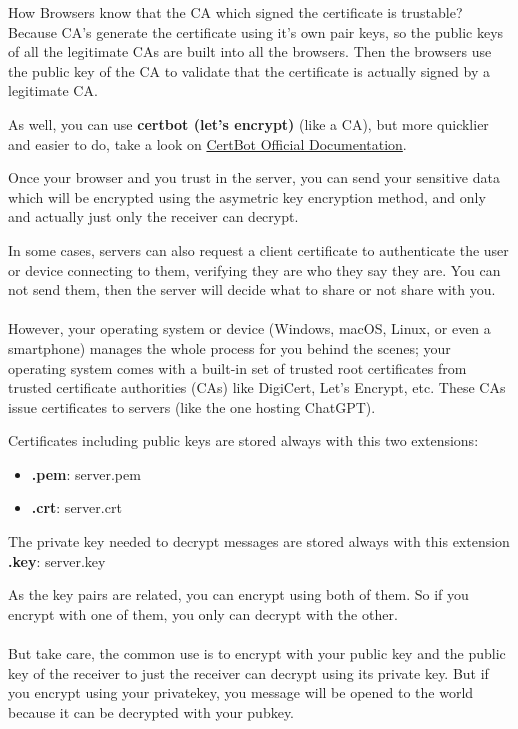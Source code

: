 \documentclass{article}
\newenvironment{blocktemplateI}[1]{%
    \tcolorbox[beamer,%
    noparskip,breakable,
    colframe=Violet,%
    colbacklower=Black,%
    title=#1]}%
    {\endtcolorbox}
\begin{document}
\begin{blocktemplateI}{Note}
How Browsers know that the CA which signed the certificate is trustable? Because CA's generate the certificate using it's own pair keys, so the public keys of all the legitimate CAs are built
into all the browsers. Then the browsers use the public key of the CA to validate that the certificate
is actually signed by a legitimate CA.
\end{blocktemplateI}

As well, you can use \textbf{certbot (let's encrypt)} (like a CA), but more quicklier and easier to do, take a look on \href{https://certbot.eff.org/}{CertBot Official Documentation}.

Once your browser and you trust in the server, you can send your sensitive data which will be encrypted using the asymetric key encryption method, and only and actually just only the receiver can decrypt.

\begin{blocktemplateI}{Note}
In some cases, servers can also request a client certificate to authenticate the user or device connecting to them, verifying they are who they say they are. You can not send them, then the server will decide what to share or not share with you.
\\\\
However, your operating system or device (Windows, macOS, Linux, or even a smartphone) manages the whole process for you behind the scenes; your operating system comes with a built-in set of trusted root certificates from trusted certificate authorities (CAs) like DigiCert, Let's Encrypt, etc. These CAs issue certificates to servers (like the one hosting ChatGPT).
\end{blocktemplateI}

Certificates including public keys are stored always with this two extensions: 
\begin{itemize}
    \item \textbf{.pem}: server.pem
    \item \textbf{.crt}: server.crt
\end{itemize}

The private key needed to decrypt messages are stored always with this extension \textbf{.key}: server.key

\begin{blocktemplateI}{Note}
As the key pairs are related, you can encrypt using both of them. So if you encrypt with one of them, you only can decrypt with the other.
\\\\
But take care, the common use is to encrypt with your public key and the public key of the receiver to just the receiver can decrypt using its private key. But if you encrypt using your privatekey, you message will be opened to the world because it can be decrypted with your pubkey.
\end{blocktemplateI}
\end{document}
